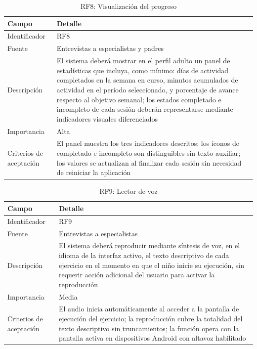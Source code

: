 					\begin{table}[H]
						\centering\small
						\caption{RF8: Visualización del progreso}
						\label{tab:rf8}
						\begin{tabular}{p{3.5cm}p{11cm}}
							\hline
							\textbf{Campo} & \textbf{Detalle} \\
							\hline
							Identificador & RF8 \\
							
							Fuente & Entrevistas a especialistas y padres \\
							
							Descripción & El sistema deberá mostrar en el perfil adulto un panel de estadísticas que incluya, como mínimo: días de actividad completados en la semana en curso, minutos acumulados de actividad en el período seleccionado, y porcentaje de avance respecto al objetivo semanal; los estados completado e incompleto de cada sesión deberán representarse mediante indicadores visuales diferenciados \\
							
							Importancia & Alta \\
							
							Criterios de aceptación & El panel muestra los tres indicadores descritos; los íconos de completado e incompleto son distinguibles sin texto auxiliar; los valores se actualizan al finalizar cada sesión sin necesidad de reiniciar la aplicación \\
							\hline
						\end{tabular}
					\end{table} \tblnote
					
					\begin{table}[H]
						\centering\small
						\caption{RF9: Lector de voz}
						\label{tab:rf9}
						\begin{tabular}{p{3.5cm}p{11cm}}
							\hline
							\textbf{Campo} & \textbf{Detalle} \\
							\hline
							Identificador & RF9 \\
							
							Fuente & Entrevistas a especialistas \\
							
							Descripción & El sistema deberá reproducir mediante síntesis de voz, en el idioma de la interfaz activo, el texto descriptivo de cada ejercicio en el momento en que el niño inicie su ejecución, sin requerir acción adicional del usuario para activar la reproducción \\
							
							Importancia & Media \\
							
							Criterios de aceptación & El audio inicia automáticamente al acceder a la pantalla de ejecución del ejercicio; la reproducción cubre la totalidad del texto descriptivo sin truncamientos; la función opera con la pantalla activa en dispositivos Android con altavoz habilitado \\
							\hline
						\end{tabular}
					\end{table} \tblnote
					
